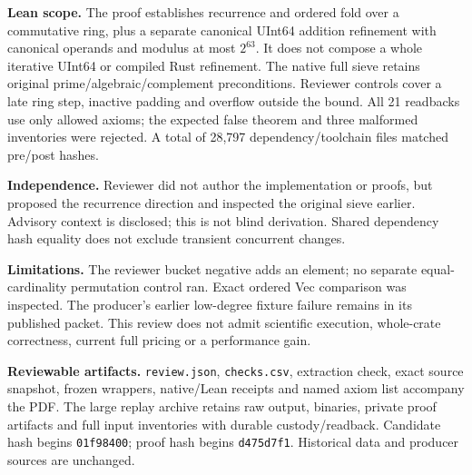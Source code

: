 \documentclass[11pt]{article}
\begin{document}
\textbf{Lean scope.} The proof establishes recurrence and ordered fold over a commutative ring, plus a separate canonical UInt64 addition refinement with canonical operands and modulus at most $2^{63}$. It does not compose a whole iterative UInt64 or compiled Rust refinement. The native full sieve retains original prime/algebraic/complement preconditions. Reviewer controls cover a late ring step, inactive padding and overflow outside the bound. All 21 readbacks use only allowed axioms; the expected false theorem and three malformed inventories were rejected. A total of 28,797 dependency/toolchain files matched pre/post hashes.

\textbf{Independence.} Reviewer did not author the implementation or proofs, but proposed the recurrence direction and inspected the original sieve earlier. Advisory context is disclosed; this is not blind derivation. Shared dependency hash equality does not exclude transient concurrent changes.

\textbf{Limitations.} The reviewer bucket negative adds an element; no separate equal-cardinality permutation control ran. Exact ordered Vec comparison was inspected. The producer's earlier low-degree fixture failure remains in its published packet. This review does not admit scientific execution, whole-crate correctness, current full pricing or a performance gain.

\textbf{Reviewable artifacts.} \texttt{review.json}, \texttt{checks.csv}, extraction check, exact source snapshot, frozen wrappers, native/Lean receipts and named axiom list accompany the PDF. The large replay archive retains raw output, binaries, private proof artifacts and full input inventories with durable custody/readback. Candidate hash begins \texttt{01f98400}; proof hash begins \texttt{d475d7f1}. Historical data and producer sources are unchanged.
\end{document}
